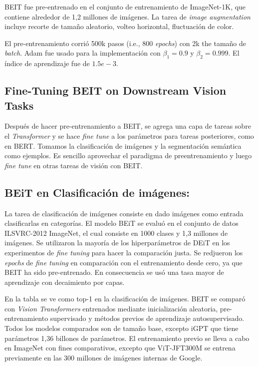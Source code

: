 BEIT fue pre-entrenado en el conjunto de entrenamiento de ImageNet-1K, que contiene alrededor de 1,2 millones de imágenes. La tarea de \textit{image augmentation} incluye recorte de tamaño aleatorio, volteo horizontal, fluctuación de color. 

El pre-entrenamiento corrió 500k pasos (i.e., 800 \textit{epochs}) con 2k the tamaño de \textit{batch}. Adam fue usado para la implementación con $\beta_{1} = 0.9$ y $\beta_{2} = 0.999$. El índice de aprendizaje fue de $1.5e-3$.

\subsection{Fine-Tuning BEIT on Downstream Vision Tasks}
Después de hacer pre-entrenamiento a BEIT, se agrega una capa de tareas sobre el \textit{Transformer} y se hace \textit{fine tune} a los parámetros para tareas posteriores, como en BERT. Tomamos la clasificación de imágenes y la segmentación semántica como ejemplos. Es sencillo aprovechar el paradigma de preentrenamiento y luego \textit{fine tune} en otras tareas de visión con BEIT.

\subsection{BEiT en Clasificación de imágenes:}

La tarea de clasificación de imágenes consiste en dado imágenes como entrada clasificarlas en categorías. El modelo BEiT se evaluó en el conjunto de datos ILSVRC-2012 ImageNet, el cual consiste en 1000 clases y 1,3 millones de imágenes. Se utilizaron la mayoría de los hiperparámetros de DEiT en los experimentos de \textit{fine tuning} para hacer la comparación justa. Se redjueron los \textit{epochs} de \textit{fine tuning} en comparación con el entrenamiento desde cero, ya que BEIT ha sido pre-entrenado. En consecuencia se usó una tasa mayor de aprendizaje con decaimiento por capas.

En la tabla se ve como top-1 en la clasificación de imágenes. BEIT se comparó con \textit{Vision Transformers} entrenados mediante inicialización aleatoria, pre-entrenamiento supervisado y métodos previos de aprendizaje autosupervisado. Todos los modelos comparados son de tamaño base, excepto iGPT que tiene parámetros 1,36 billones de parámetros. El entrenamiento previo se lleva a cabo en ImageNet con fines comparativos, excepto que ViT-JFT300M se entrena previamente en las 300 millones de imágenes internas de Google.

